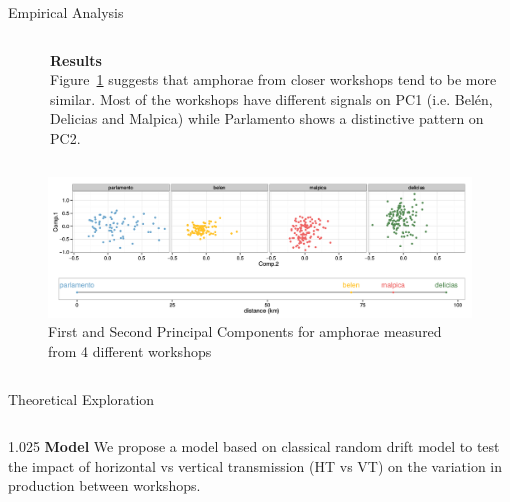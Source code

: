 \documentclass[final]{beamer}
\newlength{\sepwid}
\newlength{\onecolwid}
\newlength{\twocolwid}
\begin{document}
\begin{frame}[t]
\begin{columns}[t]
\begin{column}{\twocolwid}
\begin{block}{Empirical Analysis}
\begin{columns}[t,totalwidth=\twocolwid]
\begin{column}{\onecolwid}

\end{column}

\begin{column}{\sepwid}\end{column} %

\begin{column}{\onecolwid} %

{\textbf{Results}}\\
\justify
Figure~\ref{fig:pca} suggests that amphorae from closer workshops tend to be more similar. Most of the workshops have different signals on PC1 (i.e. Bel\'en, Delicias and Malpica) while Parlamento shows a distinctive pattern on PC2.

\end{column}
\end{columns}

\begin{columns}[t,totalwidth=\twocolwid]


\begin{column}{\twocolwid} %
\begin{figure}
\includegraphics[width=0.6\linewidth]{images/fig2.png}
\singlespace
\caption{First and Second Principal Components for amphorae measured from 4 different workshops}
\label{fig:pca}
\end{figure}
\end{column}
\end{columns}
\end{block}
\vspace{-1cm}
\begin{block}{Theoretical Exploration}

\begin{columns}[t,totalwidth=\twocolwid]

\begin{column}{1.025\onecolwid} %
{\textbf{Model }}
\justify
We propose a model based on classical random drift model \cite{bentley2004randomdriftandculturechange} to test the impact of horizontal vs vertical transmission (HT vs VT) on the variation in production between workshops.  %


\end{column}
\end{columns}
\end{block}
\end{column}
\end{columns}
\end{frame}
\end{document}

